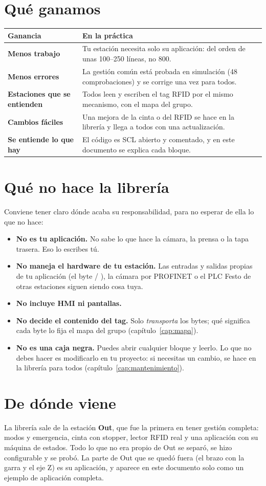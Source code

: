\section{Qué ganamos}
\begin{center}
\small
\begin{tabularx}{\textwidth}{>{\bfseries}p{3.0cm}X}
\toprule
Ganancia & En la práctica \\
\midrule
Menos trabajo & Tu estación necesita solo su aplicación: del orden de unas 100--250 líneas, no 800. \\
Menos errores & La gestión común está probada en simulación (48 comprobaciones) y se corrige una vez para todos. \\
Estaciones que se entienden & Todos leen y escriben el tag RFID por el mismo mecanismo, con el mapa del grupo. \\
Cambios fáciles & Una mejora de la cinta o del RFID se hace en la librería y llega a todos con una actualización. \\
Se entiende lo que hay & El código es SCL abierto y comentado, y en este documento se explica cada bloque. \\
\bottomrule
\end{tabularx}
\end{center}

\section{Qué \textbf{no} hace la librería}
Conviene tener claro dónde acaba su responsabilidad, para no esperar de ella lo que no hace:
\begin{itemize}
\item \textbf{No es tu aplicación.} No sabe lo que hace la cámara, la prensa o la tapa trasera. Eso lo escribes tú.
\item \textbf{No maneja el hardware de tu estación.} Las entradas y salidas propias de tu aplicación (el byte  / ), la cámara por PROFINET o el PLC Festo de otras estaciones siguen siendo cosa tuya.
\item \textbf{No incluye HMI ni pantallas.}
\item \textbf{No decide el contenido del tag.} Solo \emph{transporta} los bytes; qué significa cada byte lo fija el mapa del grupo (capítulo~\ref{cap:mapa}).
\item \textbf{No es una caja negra.} Puedes abrir cualquier bloque y leerlo. Lo que no debes hacer es modificarlo en tu proyecto: si necesitas un cambio, se hace en la librería para todos (capítulo~\ref{cap:mantenimiento}).
\end{itemize}

\section{De dónde viene}
La librería sale de la estación \textbf{Out}, que fue la primera en tener gestión completa: modos y emergencia, cinta con stopper, lector RFID real y una aplicación con su máquina de estados. Todo lo que no era propio de Out se separó, se hizo configurable y se probó. La parte de Out que se quedó fuera (el brazo con la garra y el eje Z) es su aplicación, y aparece en este documento solo como un ejemplo de aplicación completa.
